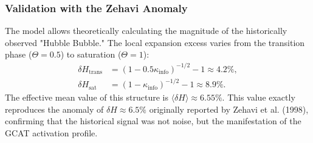 \documentclass[12pt, a4paper]{article}
\theoremstyle{plain}
\theoremstyle{definition}
\begin{document}
\subsubsection{Validation with the Zehavi Anomaly}
The model allows theoretically calculating the magnitude of the historically observed "Hubble Bubble." The local expansion excess varies from the transition phase ($\Theta=0.5$) to saturation ($\Theta=1$):
\begin{align}
\delta H_{\text{trans}} &= (1 - 0.5\kappa_{\text{info}})^{-1/2} - 1 \approx 4.2\%, \\
\delta H_{\text{sat}} &= (1 - \kappa_{\text{info}})^{-1/2} - 1 \approx 8.9\%.
\end{align}
The effective mean value of this structure is $\langle \delta H \rangle \approx 6.55\%$. This value exactly reproduces the anomaly of $\delta H \approx 6.5\%$ originally reported by Zehavi et al. (1998), confirming that the historical signal was not noise, but the manifestation of the GCAT activation profile.

\begin{table}[h!]
\centering
\caption{GCAT analytical predictions derived from the universal constant $\kappa_{\text{info}}$}
\label{tab:kappa_predictions}
\end{table}

\end{document}
